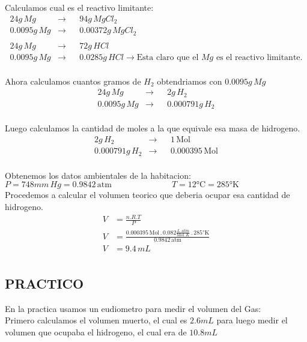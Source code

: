 \documentclass[12pt]{report}
\begin{document}
Calculamos cual es el reactivo limitante:\\

$$
\begin{aligned}
    24g \, Mg &\rightarrow&& 94g \, MgCl_2 \\[6pt]
    0.0095g \, Mg &\rightarrow&& 0.00372g \, MgCl_2\\[6pt]
    \\
    24g \, Mg &\rightarrow&& 72g \, HCl \\[6pt]
    0.0095g \, Mg &\rightarrow&& 0.0285g \, HCl \rightarrow \text{Esta claro que el $Mg$ es el reactivo limitante.}\\[6pt]
\end{aligned}
$$

Ahora calculamos cuantos gramos de $H_2$ obtendriamos con $0.0095g \, Mg$ \\

$$
\begin{aligned}
    24g \, Mg &\rightarrow&& 2g \, H_2 \\[6pt]
    0.0095g \, Mg &\rightarrow&& 0.000791g \, H_2\\[6pt]
\end{aligned}
$$

Luego calculamos la cantidad de moles a la que equivale esa masa de hidrogeno.\\

$$
\begin{aligned}
    2g \, H_2  &\rightarrow&& 1 \, \text{Mol} \\[6pt]
    0.000791g \, H_2 &\rightarrow&& 0.000395 \,\text{Mol}  \\[6pt]
\end{aligned}
$$

Obtenemos los datos ambientales de la habitacion:\\[6pt]
$P = 748mm \, Hg = 0.9842 \, \text{atm} \hspace{3cm} T= 12 \text{°C} = 285 \text{°K}$\\[6pt]
Procedemos a calcular el volumen teorico que deberia ocupar esa cantidad de hidrogeno.\\

$$
\begin{aligned}
    V&=\frac{n . R . T}{P}\\[6pt]
    V&=\frac{0.000395 \, \text{Mol}\, . \, 0.082 \frac{L \, . atm}{\text{Mol} \, . K} \, . \, 285 \text{°K}}{0.9842 \, \text{atm}}\\[6pt]
    V&=9.4 \, mL\\[6pt]
\end{aligned}
$$

\subsection{PRACTICO}

En la practica usamos un eudiometro para medir el volumen del Gas:\\

Primero calculamos el volumen muerto, el cual es $2.6mL$ para luego medir el volumen que ocupaba el hidrogeno, el cual era de $10.8mL$
\end{document}
